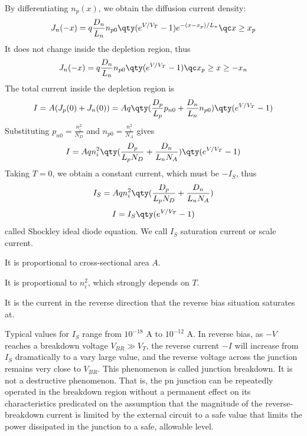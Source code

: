 \documentclass[a4paper,12pt]{article}
\begin{document}
By differentiating $n_p(x)$, we obtain the diffusion current density:
\[J_n(-x)=q\frac{D_n}{L_n}n_{p0}\qty(e^{V/V_T}-1)e^{-(x-x_p)/L_n}\qc x\ge x_p\]
It does not change inside the depletion region, thus
\[J_n(-x)=q\frac{D_n}{L_n}n_{p0}\qty(e^{V/V_T}-1)\qc x_p\ge x\ge -x_n\]
\eit
The total current inside the depletion region is
\[I=A(J_p(0)+J_n(0))=Aq\qty(\frac{D_p}{L_p}p_{n0}+\frac{D_n}{L_n}n_{p0})\qty(e^{V/V_T}-1)\]
Substituting $p_{n0}=\frac{n_i^2}{N_D}$ and $n_{p0}=\frac{n_i^2}{N_A}$ gives
\[I=Aqn_i^2\qty(\frac{D_p}{L_pN_D}+\frac{D_n}{L_nN_A})\qty(e^{V/V_T}-1)\]
Taking $T=0$, we obtain a constant current, which must be $-I_S$, thus
\[I_S=Aqn_i^2\qty(\frac{D_p}{L_pN_D}+\frac{D_n}{L_nN_A})\]
\[I=I_S\qty(e^{V/V_T}-1)\]
called Shockley ideal diode equation.
We call $I_S$ saturation current or scale current.
\bit
\item It is proportional to cross-sectional area $A$.
\item It is proportional to $n_i^2$, which strongly depends on $T$.
\item It is the current in the reverse direction that the reverse bias situation saturates at.
\item Typical values for $I_S$ range from $10^{-18}$ A to $10^{-12}$ A.
\eit
{}
In reverse bias, as $-V$ reaches a breakdown voltage $V_{BR}\gg V_T$, the reverse current $-I$ will increase from $I_S$ dramatically to a vary large value, and the reverse voltage across the junction remains very close to $V_{BR}$. This phenomenon is called junction breakdown. It is not a destructive phenomenon. That is, the pn junction can be repeatedly operated in the breakdown region without a permanent effect on its characteristics predicated on the assumption that the magnitude of the reverse-breakdown current is limited by the external circuit to a safe value that limits the power dissipated in the junction to a safe, allowable level.
\end{document}
